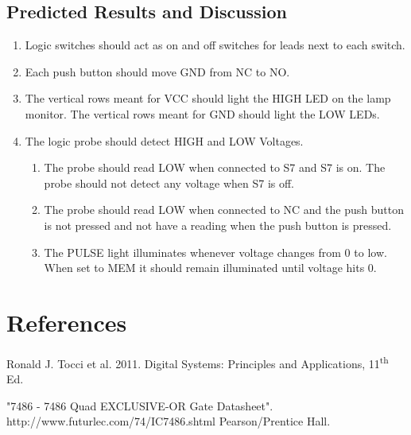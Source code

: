 \documentclass[11pt,a4paper]{article}
\begin{document}
\subsection{Predicted Results and Discussion}
\begin{enumerate}
    \item Logic switches should act as on and off switches for leads next to each switch.
    \item Each push button should move GND from NC to NO.
    \item The vertical rows meant for VCC should light the HIGH LED on the lamp monitor.
        The vertical rows meant for GND should light the LOW LEDs.
    \item The logic probe should detect HIGH and LOW Voltages.
    \begin{enumerate}
        \item The probe should read LOW when connected to S7 and S7 is on. The probe should
            not detect any voltage when S7 is off.
        \item The probe should read LOW when connected to NC and the push button is not
            pressed and not have a reading when the push button is pressed.
        \item The PULSE light illuminates whenever voltage changes from 0 to low. When set
            to MEM it should remain illuminated until voltage hits 0.
    \end{enumerate}
\end{enumerate}
\pagebreak
\section{References}
Ronald J. Tocci et al. 2011. Digital Systems: Principles and Applications, 11\textsuperscript{th} Ed.

"7486 - 7486 Quad EXCLUSIVE-OR Gate Datasheet". http://www.futurlec.com/74/IC7486.shtml
\hspace{1cm}Pearson/Prentice Hall.
\end{document}
